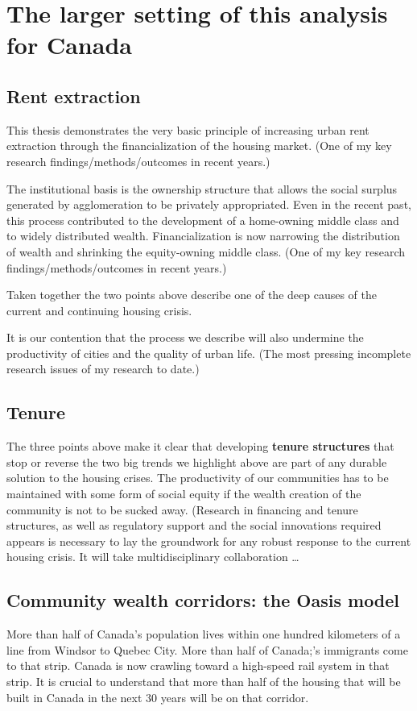 \section{The larger setting of this analysis for Canada}

\subsection{Rent extraction}

This thesis demonstrates the very basic principle of increasing urban rent extraction through the financialization of the housing market. 
{\color{red}(One of my key research findings/methods/outcomes in recent years.)}
 
The institutional basis is the ownership structure that allows the social surplus generated by agglomeration to be privately appropriated. Even in the recent past, this process contributed to the development of a home-owning middle class and to widely distributed wealth. Financialization is now narrowing the distribution of wealth and shrinking the equity-owning middle class. {\color{red}(One of my key research findings/methods/outcomes in recent years.)}

Taken together the two points above describe  one of the deep causes of the current and continuing housing crisis.

It is our contention that the process we describe will also undermine the productivity of cities and the quality of urban life. {\color{red}(The most pressing incomplete research issues of my research to date.)} 



\subsection{Tenure}
The three points above make  it clear that developing \textbf{tenure structures} that stop or reverse the two big trends we highlight above are part of any durable solution to the housing crises. The productivity of our communities has to be maintained with some form of social equity if the wealth creation of the community is not to be sucked away.     {\color{red}(Research in financing and tenure structures, as well as regulatory support and the social innovations required appears is necessary to lay the groundwork for any robust response to the current housing crisis. It will take  multidisciplinary collaboration  \dots}

\subsection{Community wealth corridors: the Oasis model}
More than half of Canada's population lives within  one hundred kilometers of a line from Windsor to Quebec City. More than half of Canada;'s immigrants come to that strip. Canada is now crawling toward a high-speed rail system in that strip. It is crucial to understand that more than half of the housing that will be built in Canada in the next 30 years will be on that corridor. 

